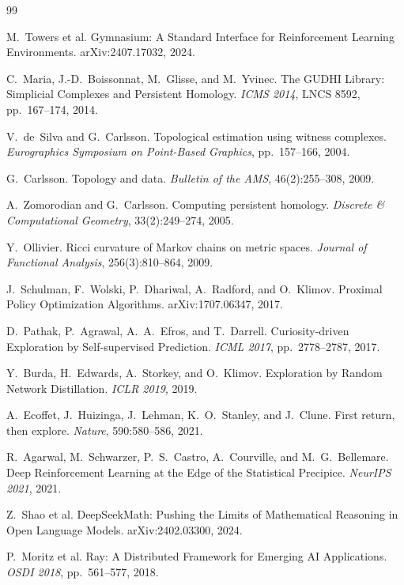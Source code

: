 \documentclass[11pt]{article}
\begin{document}
\begin{thebibliography}{99}
\itemsep0pt

 M.~Towers et al.
\newblock Gymnasium: A Standard Interface for Reinforcement Learning
Environments.
\newblock arXiv:2407.17032, 2024.

 C.~Maria, J.-D.~Boissonnat, M.~Glisse, and
M.~Yvinec.
\newblock The GUDHI Library: Simplicial Complexes and Persistent
Homology.
\newblock \emph{ICMS 2014}, LNCS 8592, pp.~167--174, 2014.

 V.~de~Silva and G.~Carlsson.
\newblock Topological estimation using witness complexes.
\newblock \emph{Eurographics Symposium on Point-Based Graphics},
pp.~157--166, 2004.

 G.~Carlsson.
\newblock Topology and data.
\newblock \emph{Bulletin of the AMS}, 46(2):255--308, 2009.

 A.~Zomorodian and G.~Carlsson.
\newblock Computing persistent homology.
\newblock \emph{Discrete \& Computational Geometry},
33(2):249--274, 2005.

 Y.~Ollivier.
\newblock Ricci curvature of Markov chains on metric spaces.
\newblock \emph{Journal of Functional Analysis}, 256(3):810--864,
2009.

 J.~Schulman, F.~Wolski, P.~Dhariwal,
A.~Radford, and O.~Klimov.
\newblock Proximal Policy Optimization Algorithms.
\newblock arXiv:1707.06347, 2017.

 D.~Pathak, P.~Agrawal, A.~A.~Efros, and
T.~Darrell.
\newblock Curiosity-driven Exploration by Self-supervised
Prediction.
\newblock \emph{ICML 2017}, pp.~2778--2787, 2017.

 Y.~Burda, H.~Edwards, A.~Storkey, and O.~Klimov.
\newblock Exploration by Random Network Distillation.
\newblock \emph{ICLR 2019}, 2019.

 A.~Ecoffet, J.~Huizinga, J.~Lehman,
K.~O.~Stanley, and J.~Clune.
\newblock First return, then explore.
\newblock \emph{Nature}, 590:580--586, 2021.

 R.~Agarwal, M.~Schwarzer, P.~S.~Castro,
A.~Courville, and M.~G.~Bellemare.
\newblock Deep Reinforcement Learning at the Edge of the Statistical
Precipice.
\newblock \emph{NeurIPS 2021}, 2021.

 Z.~Shao et al.
\newblock DeepSeekMath: Pushing the Limits of Mathematical Reasoning
in Open Language Models.
\newblock arXiv:2402.03300, 2024.

 P.~Moritz et al.
\newblock Ray: A Distributed Framework for Emerging AI Applications.
\newblock \emph{OSDI 2018}, pp.~561--577, 2018.

\end{thebibliography}
\end{document}
